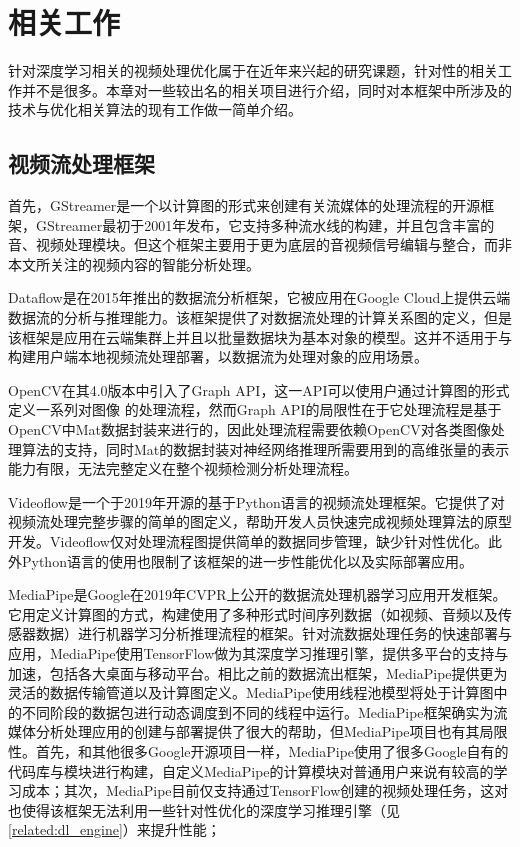
\chapter{相关工作}\label{related_work}
针对深度学习相关的视频处理优化属于在近年来兴起的研究课题，针对性的相关工作并不是很多。本章对一些较出名的相关项目进行介绍，同时对本框架中所涉及的技术与优化相关算法的现有工作做一简单介绍。

\section{视频流处理框架}\label{ch2:framewk}
首先，GStreamer\cite{gstreamer}是一个以计算图的形式来创建有关流媒体的处理流程的开源框架，GStreamer最初于2001年发布，它支持多种流水线的构建，并且包含丰富的音、视频处理模块。但这个框架主要用于更为底层的音视频信号编辑与整合，而非本文所关注的视频内容的智能分析处理。\par
Dataflow\cite{akidau2015dataflow}是在2015年推出的数据流分析框架，它被应用在Google Cloud上提供云端数据流的分析与推理能力。该框架提供了对数据流处理的计算关系图的定义，但是该框架是应用在云端集群上并且以批量数据块为基本对象的模型。这并不适用于与构建用户端本地视频流处理部署，以数据流为处理对象的应用场景。\par 
OpenCV在其4.0版本中引入了Graph API\cite{matveev2018opencv}，这一API可以使用户通过计算图的形式定义一系列对图像
的处理流程，然而Graph API的局限性在于它处理流程是基于OpenCV中Mat数据封装来进行的，因此处理流程需要依赖OpenCV对各类图像处理算法的支持，同时Mat的数据封装对神经网络推理所需要用到的高维张量的表示能力有限，无法完整定义在整个视频检测分析处理流程。\par
Videoflow\cite{deArmas2019videoflow}是一个于2019年开源的基于Python语言的视频流处理框架。它提供了对视频流处理完整步骤的简单的图定义，帮助开发人员快速完成视频处理算法的原型开发。Videoflow仅对处理流程图提供简单的数据同步管理，缺少针对性优化。此外Python语言的使用也限制了该框架的进一步性能优化以及实际部署应用。\par
MediaPipe\cite{lugaresi2019mediapipe}是Google在2019年CVPR上公开的数据流处理机器学习应用开发框架。
它用定义计算图的方式，构建使用了多种形式时间序列数据（如视频、音频以及传感器数据）进行机器学习分析推理流程的框架。针对流数据处理任务的快速部署与应用，MediaPipe使用TensorFlow\cite{abadi2016tensorflow}做为其深度学习推理引擎，提供多平台的支持与加速，包括各大桌面与移动平台。相比之前的数据流出框架，MediaPipe提供更为灵活的数据传输管道以及计算图定义。MediaPipe使用线程池模型将处于计算图中的不同阶段的数据包进行动态调度到不同的线程中运行。MediaPipe框架确实为流媒体分析处理应用的创建与部署提供了很大的帮助，但MediaPipe项目也有其局限性。首先，和其他很多Google开源项目一样，MediaPipe使用了很多Google自有的代码库与模块进行构建，自定义MediaPipe的计算模块对普通用户来说有较高的学习成本；其次，MediaPipe目前仅支持通过TensorFlow创建的视频处理任务，这对也使得该框架无法利用一些针对性优化的深度学习推理引擎（见\ref{related:dl_engine}）来提升性能；
